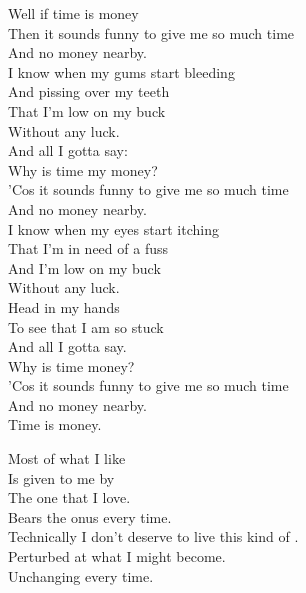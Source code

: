 


Well if time is money \\
Then it sounds funny to give me so much time \\
And no money nearby. \\

I know when my gums start bleeding \\
And pissing over my teeth \\
That I'm low on my buck \\
Without any luck. \\
And all I gotta say: \\

Why is time my money? \\
'Cos it sounds funny to give me so much time \\
And no money nearby. \\

I know when my eyes start itching \\
That I'm in need of a fuss \\
And I'm low on my buck \\
Without any luck. \\
Head in my hands \\
To see that I am so stuck \\
And all I gotta say. \\

Why is time money? \\
'Cos it sounds funny to give me so much time \\
And no money nearby. \\

Time is money. \\




Most of what I like \\
Is given to me by \\
The one that I love. \\
Bears the onus every time. \\

Technically I don't deserve to live this kind of . \\
Perturbed at what I might become. \\
Unchanging every time. \\


